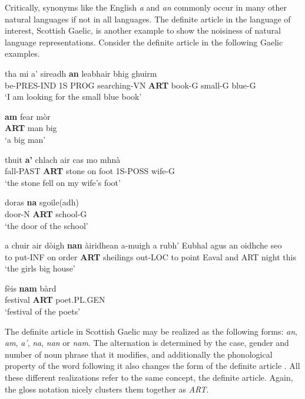 \documentclass[final]{ua-thesis}
\numberwithin{equation}{section}
\begin{document}
Critically, synonyms like the English \textit{a} and \textit{an} commonly occur in many other natural languages if not in all languages. The definite article in the language of interest, Scottish Gaelic, is another example to show the noisiness of natural language representations. Consider the definite article in the following Gaelic examples. 

\begin{exe}  
\ex 
\gll tha mi a' sireadh \textbf{an} leabhair bhig ghuirm\\
be-PRES-IND 1S PROG searching-VN \textbf{ART} book-G small-G blue-G\\
\glt `I am looking for the small blue book' \citep[p. 29]{lamb2001scottish}

\ex 
\gll \textbf{am} fear m\`or\\
\textbf{ART} man big\\
\glt `a big man' \citep[p. 31]{lamb2001scottish}

\ex
\gll thuit \textbf{a'} chlach air cas mo mhn\`a\\
fall-PAST \textbf{ART} stone on foot 1S-POSS wife-G\\
\glt`the stone fell on my wife's foot' \citep[p. 30]{lamb2001scottish} 	

\ex
\gll doras \textbf{na} sgoile(adh) \\
door-N \textbf{ART} school-G \\
\glt `the door of the school' \citep[p. 29]{lamb2001scottish} 	

\ex 
\gll a chuir air d\`oigh \textbf{nan} \`airidhean a-muigh a rubh' Eubhal agus an oidhche seo \\
to put-INF on order \textbf{ART} sheilings out-LOC to point Eaval and ART night this \\
\glt `the girls big house' \citep[p. 100]{lamb2001scottish} 

\ex
\gll f\`eis \textbf{nam} b\`ard\\
festival \textbf{ART} poet.PL.GEN\\
\glt `festival of the poets' \citep[p. 107]{lamb2001scottish}

\end{exe}

The definite article in Scottish Gaelic may be realized as the following forms: \textit{an}, \textit{am}, \textit{a'}, \textit{na}, \textit{nan} or \textit{nam}. The alternation is determined by the case, gender and number of noun phrase that it modifies, and additionally the phonological property of the word following it also changes the form of the definite article \citep{lamb2001scottish}. All these different realizations refer to the same concept, the definite article. Again, the gloss notation nicely clusters them together as \textit{ART}. 
\end{document}
